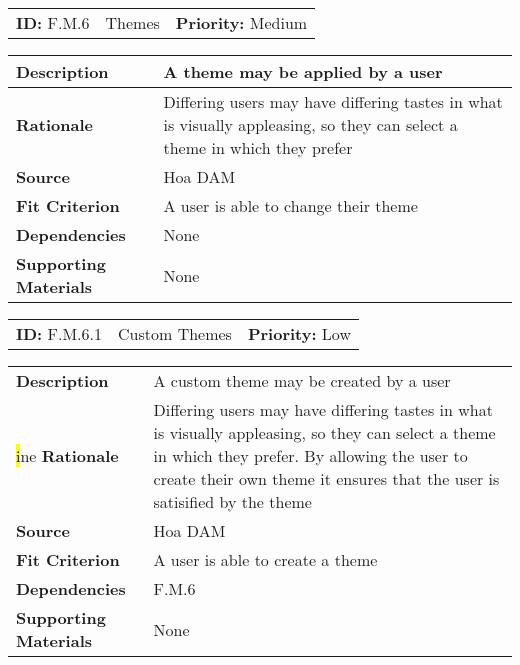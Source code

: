 \begin{table}[H]
    \begin{tabularx}{\textwidth}{| l | X | l |}
        \hline
        \textbf{ID:} F.M.6 & Themes & \textbf{Priority:} Medium \\
    \end{tabularx}
    \begin{tabularx}{\textwidth}{| l | X |}
        \hline
        \textbf{Description} & A theme may be applied by a user\\ \hline
        \textbf{Rationale} & Differing users may have differing tastes in what is visually appleasing, so they can select a theme in which they prefer\\ \hline
        \textbf{Source} & Hoa DAM\\ \hline
        \textbf{Fit Criterion} & A user is able to change their theme \\ \hline
        \textbf{Dependencies} & None \\ \hline
        \textbf{Supporting Materials} & None \\ \hline
    \end{tabularx}
\end{table}

\begin{table}[H]
    \begin{tabularx}{\textwidth}{| l | X | l |}
        \hline
        \textbf{ID:} F.M.6.1 & Custom Themes & \textbf{Priority:} Low \\
    \end{tabularx}
    \begin{tabularx}{\textwidth}{| l | X |}
        \hline
        \textbf{Description} & A custom theme may be created by a user\\ \hl ine
        \textbf{Rationale} & Differing users may have differing tastes in what is visually appleasing, so they can select a theme in which they prefer. By allowing the user to create their own theme it ensures that the user is satisified by the theme\\ \hline
        \textbf{Source} & Hoa DAM\\ \hline
        \textbf{Fit Criterion} & A user is able to create a theme \\ \hline
        \textbf{Dependencies} & F.M.6 \\ \hline
        \textbf{Supporting Materials} & None \\ \hline
    \end{tabularx}
\end{table}

